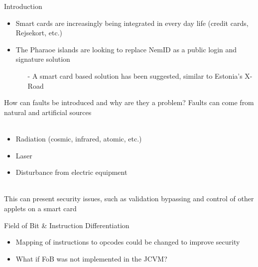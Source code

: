 


\begin{frame}[fragile]{Introduction}
\begin{center}
	\begin{itemize}
	\item Smart cards are increasingly being integrated in every day life (credit cards, Rejsekort, etc.)
	\item The Pharaoe islands are looking to replace NemID as a public login and signature solution
		\begin{itemize}
		\item[-] A smart card based solution has been suggested, similar to Estonia's X-Road 
		\end{itemize}
	\end{itemize}
\end{center}
\end{frame}

\begin{frame}[fragile]{\large How can faults be introduced and why are they a problem?}
Faults can come from natural and artificial sources\\~\\
	\begin{itemize}
	\item Radiation (cosmic, infrared, atomic, etc.)
	\item Laser
    \item Disturbance from electric equipment\\~\\
	\end{itemize}
This can present security issues, such as validation bypassing and control of other applets on a smart card
\end{frame}

\begin{frame}[fragile]{Field of Bit \& Instruction Differentiation}
\begin{itemize}
\item Mapping of instructions to opcodes could be changed to improve security
\item What if FoB was not implemented in the JCVM?
\end{itemize}
\end{frame}

